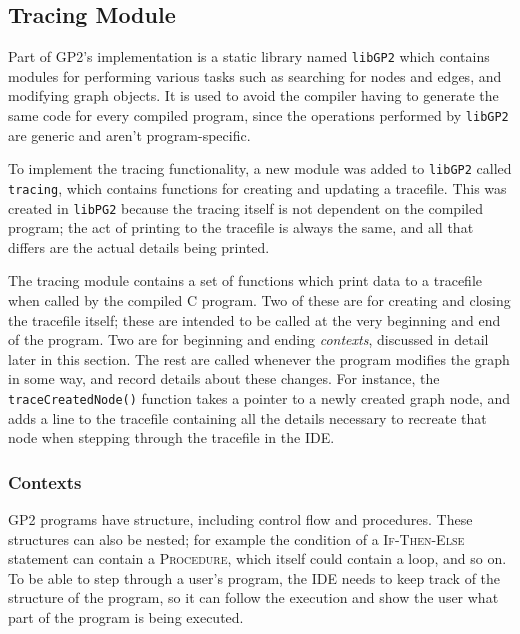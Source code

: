 \documentclass[authoryearcitations]{UoYCSproject}
\begin{document}
\subsection{Tracing Module}
\label{sec:TracingModule}

Part of GP2's implementation is a static library named \texttt{libGP2} which
contains modules for performing various tasks such as searching for nodes and edges,
and modifying graph objects. It is used to avoid the compiler having to generate
the same code for every compiled program, since the operations performed by \texttt{libGP2}
are generic and aren't program-specific.

To implement the tracing functionality, a new module was added to \texttt{libGP2}
called \texttt{tracing}, which contains functions for creating and updating a
tracefile. This was created in \texttt{libPG2} because the tracing itself is
not dependent on the compiled program; the act of printing to the tracefile is
always the same, and all that differs are the actual details being printed.

The tracing module contains a set of functions which print data to a tracefile
when called by the compiled C program. Two of these are for creating and closing
the tracefile itself; these are intended to be called at the very beginning and
end of the program. Two are for beginning and ending \emph{contexts}, discussed
in detail later in this section. The rest are called whenever the program modifies
the graph in some way, and record details about these changes. For instance, the
\texttt{traceCreatedNode()} function takes a pointer to a newly created graph
node, and adds a line to the tracefile containing all the details necessary to
recreate that node when stepping through the tracefile in the IDE.


\subsubsection{Contexts}
\label{sec:Contexts}

GP2 programs have structure, including control flow and procedures. These
structures can also be nested; for example the condition of a \textsc{If-Then-Else}
statement can contain a \textsc{Procedure}, which itself could contain a loop,
and so on. To be able to step through a user's program, the IDE needs to keep
track of the structure of the program, so it can follow the execution and show
the user what part of the program is being executed.
\end{document}
